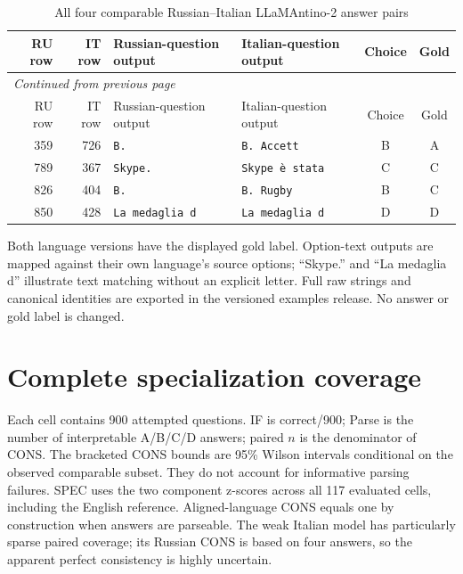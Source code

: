 \begingroup\footnotesize\setlength{\tabcolsep}{4pt}\renewcommand{\arraystretch}{1.15}
\begin{longtable}{rrp{4.2cm}p{4.2cm}cc}
\caption{All four comparable Russian--Italian LLaMAntino-2 answer pairs}\label{tab:belebele-four-pairs}\\

\toprule
RU row & IT row & Russian-question output & Italian-question output & Choice & Gold\\
\midrule
\endfirsthead
\multicolumn{6}{l}{\textit{Continued from previous page}}\\
\toprule
RU row & IT row & Russian-question output & Italian-question output & Choice & Gold\\
\midrule
\endhead


359 & 726 & \texttt{B.} & \texttt{B. Accett} & B & A\\

789 & 367 & \texttt{Skype.} & \texttt{Skype è stata} & C & C\\

826 & 404 & \texttt{B.} & \texttt{B. Rugby} & B & C\\

850 & 428 & \texttt{La medaglia d} & \texttt{La medaglia d} & D & D\\

\bottomrule
\end{longtable}

\par\smallskip\footnotesize Both language versions have the displayed gold label. Option-text outputs are mapped against their own language's source options; ``Skype.'' and ``La medaglia d'' illustrate text matching without an explicit letter. Full raw strings and canonical identities are exported in the versioned examples release. No answer or gold label is changed.

\endgroup

\section{Complete specialization coverage}
Each cell contains 900 attempted questions. IF is correct/900; Parse is the number of interpretable A/B/C/D answers; paired $n$ is the denominator of CONS. The bracketed CONS bounds are 95\% Wilson intervals conditional on the observed comparable subset. They do not account for informative parsing failures. SPEC uses the two component z-scores across all 117 evaluated cells, including the English reference. Aligned-language CONS equals one by construction when answers are parseable. The weak Italian model has particularly sparse paired coverage; its Russian CONS is based on four answers, so the apparent perfect consistency is highly uncertain.


